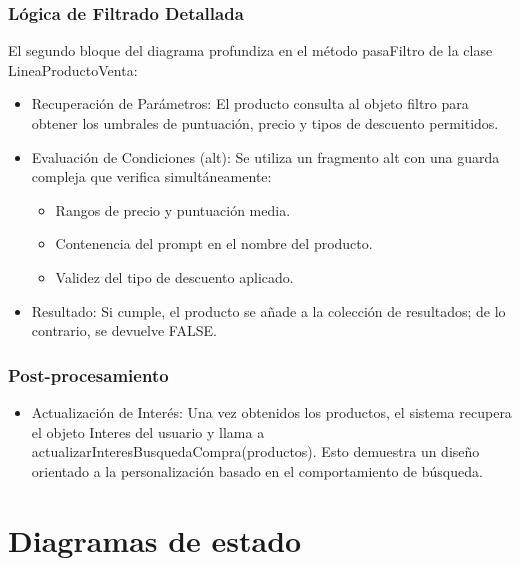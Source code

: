 \documentclass{article}
\begin{document}
\subsubsection{Lógica de Filtrado Detallada}
El segundo bloque del diagrama profundiza en el método pasaFiltro de la clase LineaProductoVenta:
\begin{itemize}
  \item Recuperación de Parámetros: El producto consulta al objeto filtro para obtener los umbrales de puntuación, precio y tipos de descuento permitidos.
  \item Evaluación de Condiciones (alt): Se utiliza un fragmento alt con una guarda compleja que verifica simultáneamente:
  \begin{itemize}
    \item Rangos de precio y puntuación media.
    \item Contenencia del prompt en el nombre del producto.
    \item Validez del tipo de descuento aplicado.
  \end{itemize}
\item Resultado: Si cumple, el producto se añade a la colección de resultados; de lo contrario, se devuelve FALSE.
\end{itemize}
  \subsubsection{Post-procesamiento}
\begin{itemize}
  \item Actualización de Interés: Una vez obtenidos los productos, el sistema recupera el objeto Interes del usuario y llama a actualizarInteresBusquedaCompra(productos). Esto demuestra un diseño orientado a la personalización basado en el comportamiento de búsqueda.
\end{itemize}

\section{Diagramas de estado}
\end{document}
